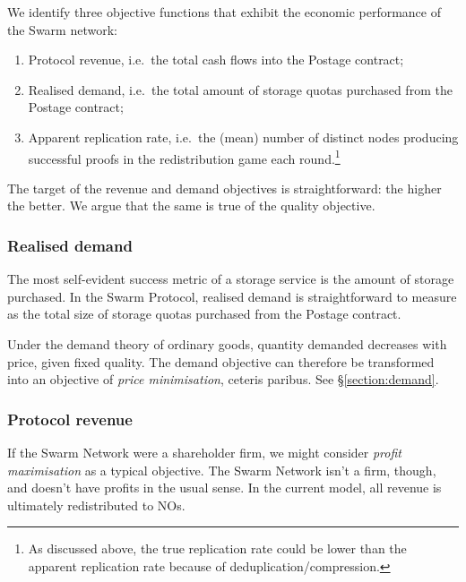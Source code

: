 We identify three objective functions that exhibit the economic performance of the Swarm network:
%
\begin{enumerate}

  \item Protocol revenue, i.e.~the total cash flows into the Postage contract;

  \item Realised demand, i.e.~the total amount of storage quotas purchased from the Postage contract;

  \item Apparent replication rate, i.e.~the (mean) number of distinct nodes producing successful proofs in the redistribution game each round.\footnote{As discussed above, the true replication rate could be lower than the apparent replication rate because of deduplication/compression.}

\end{enumerate}
%
The target of the revenue and demand objectives is straightforward: the higher the better.
%
We argue that the same is true of the quality objective.


\subsubsection{Realised demand}

The most self-evident success metric of a storage service is the amount of storage purchased.
%
In the Swarm Protocol, realised demand is straightforward to measure as the total size of storage quotas purchased from the Postage contract.

Under the demand theory of ordinary goods, quantity demanded decreases with price, given fixed quality.
%
The demand objective can therefore be transformed into an objective of \emph{price minimisation}, ceteris paribus.
%
See \S\ref{section:demand}.


\subsubsection{Protocol revenue}

If the Swarm Network were a shareholder firm, we might consider \emph{profit maximisation} as a typical objective.
%
The Swarm Network isn't a firm, though, and doesn't have profits in the usual sense.
%
In the current model, all revenue is ultimately redistributed to NOs.

